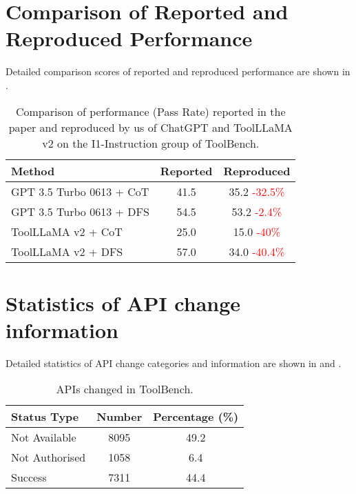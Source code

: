 
\section{Comparison of Reported and Reproduced Performance}
Detailed comparison scores of reported and reproduced performance are shown in .

\begin{table}[ht!]
    \centering
    \small
    \begin{tabular}{lcc}
        \toprule
        {\textbf{Method}} & Reported & Reproduced \\
        \midrule
         GPT 3.5 Turbo 0613 + CoT & 41.5 & 35.2 \textcolor{red}{{\tiny 
         -32.5\%}} \\
         GPT 3.5 Turbo 0613 + DFS & 54.5 & 53.2 \textcolor{red}{{\tiny 
         -2.4\%}}\\
         ToolLLaMA v2 + CoT & 25.0 & 15.0 \textcolor{red}{{\tiny 
         -40\%}} \\
         ToolLLaMA v2 + DFS & 57.0 & 34.0 \textcolor{red}{{\tiny 
         -40.4\%}}\\
         \bottomrule
    \end{tabular}
    \caption{Comparison of performance (Pass Rate) reported in the paper and reproduced by us of ChatGPT and ToolLLaMA v2 on the I1-Instruction group of ToolBench. }
    \label{tab:performance_comparison}
\end{table}

\section{Statistics of API change information}
Detailed statistics of API change categories and information are shown in  and .

\begin{table}[h!]
    \centering
    \small
    \begin{tabular}{lcc}
     \toprule
    \textbf{Status Type} & \textbf{Number} & \textbf{Percentage} (\%) \\
    \midrule
    Not Available & 8095 & 49.2 \\
    Not Authorised & 1058 & 6.4 \\
    Success & 7311 & 44.4 \\
     \bottomrule
    \end{tabular}
    \caption{APIs changed in ToolBench.}
    \label{tab:api_change}
\end{table}



